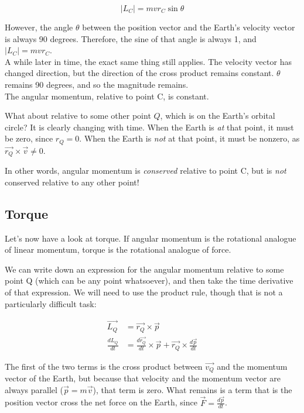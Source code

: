 \begin{equation}
|L_C| = m v r_C \sin \theta
\end{equation}

However, the angle $\theta$ between the position vector and the Earth's velocity vector is always 90 degrees. Therefore, the sine of that angle is always 1, and $|L_C| = m v r_C$.\\
A while later in time, the exact same thing still applies. The velocity vector has changed direction, but the direction of the cross product remains constant. $\theta$ remains 90 degrees, and so the magnitude remains.\\
The angular momentum, relative to point C, is constant.

What about relative to some other point $Q$, which is on the Earth's orbital circle? It is clearly changing with time. When the Earth is \emph{at} that point, it must be zero, since $r_Q = 0$. When the Earth is \emph{not} at that point, it must be nonzero, as $\vec{r_Q} \times \vec{v} \neq 0$.

In other words, angular momentum is \emph{conserved} relative to point C, but is \emph{not} conserved relative to any other point!

\subsection{Torque}

Let's now have a look at torque. If angular momentum is the rotational analogue of linear momentum, torque is the rotational analogue of force.

We can write down an expression for the angular momentum relative to some point Q (which can be any point whatsoever), and then take the time derivative of that expression. We will need to use the product rule, though that is not a particularly difficult task:

\begin{align}
\vec{L_Q} &= \vec{r_Q} \times \vec{p}\\
\frac{dL_Q}{dt} &= \frac{d\vec{r_Q}}{dt} \times \vec{p} + \vec{r_Q} \times \frac{d\vec{p}}{dt}
\end{align}

The first of the two terms is the cross product between $\vec{v_Q}$ and the momentum vector of the Earth, but because that velocity and the momentum vector are always parallel ($\vec{p} = m \vec{v}$), that term is zero. What remains is a term that is the position vector cross the net force on the Earth, since $\displaystyle \vec{F} = \frac{d\vec{p}}{dt}$.

